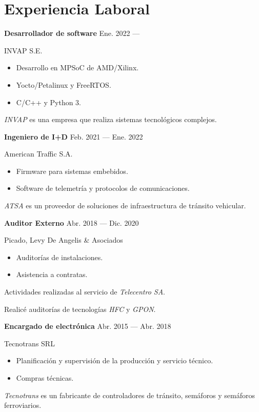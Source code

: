 \section{Experiencia Laboral}


\parbox[t][][t]{\linewidth}{
	\parbox{\linewidth}{
		\textbf{Desarrollador de software}
			\hfill
			{Ene. 2022 --- \phantom{Dic. 2099}}
		}
	\smallbreak
	\parbox{\linewidth}{INVAP S.E.}
	\smallbreak
	\begin{itemize}
	    \item{Desarrollo en MPSoC de AMD/Xilinx.}
		\item{Yocto/Petalinux y FreeRTOS.}
		\item{C/C++ y Python 3.}
	\end{itemize}
	\smallbreak
    \emph{INVAP} es una empresa que realiza sistemas tecnológicos complejos.
}

\bigskip
\parbox[t][][t]{\linewidth}{
	\parbox{\linewidth}{
		\textbf{Ingeniero de I+D}
			\hfill
			{Feb. 2021 --- Ene. 2022}
		}
	\smallbreak
	\parbox{\linewidth}{American Traffic S.A.}
	\smallbreak
	\begin{itemize}
	    \item{Firmware para sistemas embebidos.}
	    \item{Software de telemetría y protocolos de comunicaciones.}
	\end{itemize}
	\smallbreak
    \emph{ATSA} es un proveedor de soluciones de infraestructura de tránsito vehicular.
}

\bigskip
\parbox[t][][t]{\linewidth}{
	\parbox{\linewidth}{
		\textbf{Auditor Externo}
			\hfill
			{Abr. 2018 --- Dic. 2020}
		}
	\smallbreak
	\parbox{\linewidth}{Picado, Levy De Angelis \& Asociados}
	\smallbreak
	\begin{itemize}
	    \item{Auditorías de instalaciones.}
	    \item{Asistencia a contratas.}
	\end{itemize}
	\smallbreak
	Actividades realizadas al servicio de \emph{Telecentro SA}.

    Realicé auditorías de tecnologías \emph{HFC} y \emph{GPON}.
}

\bigskip
\parbox[t][][t]{\linewidth}{
	{\parbox{\linewidth}{
		\parbox{\linewidth}{
			\textbf{Encargado de electrónica}
			\hfill
			{Abr. 2015 --- Abr. 2018}
		}
	}}
	\smallbreak
	\parbox{\linewidth}{Tecnotrans SRL}
	\smallbreak
	\begin{itemize}
	    \item{Planificación y supervisión de la producción y servicio técnico.}
	    \item{Compras técnicas.}
	\end{itemize}
	\smallbreak
	\emph{Tecnotrans} es un fabricante de controladores de tránsito, semáforos y semáforos ferroviarios.
}

